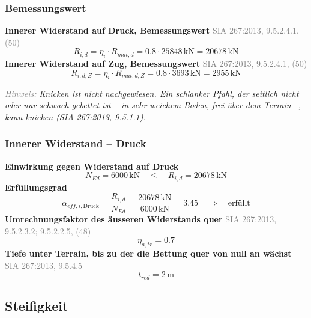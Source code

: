 \documentclass[11pt,a4paper]{article}
\newcommand{\normref}[1]{{\small\textcolor{gray}{#1}}}
\newcommand{\hinweis}[2]{\par\noindent\textcolor{gray}{\textit{#1:}} \textit{#2}\par}
\begin{document}
\subsubsection{Bemessungswert}
\noindent\textbf{Innerer Widerstand auf Druck, Bemessungswert} \hfill \normref{SIA 267:2013, 9.5.2.4.1, (50)}
\begin{equation*}
R_{i,d} = \eta_i \cdot R_{mat,d} = 0.8 \cdot 25848\,\mathrm{kN} = 20678\,\mathrm{kN}
\end{equation*}
\noindent\textbf{Innerer Widerstand auf Zug, Bemessungswert} \hfill \normref{SIA 267:2013, 9.5.2.4.1, (50)}
\begin{equation*}
R_{i,d,Z} = \eta_i \cdot R_{mat,d,Z} = 0.8 \cdot 3693\,\mathrm{kN} = 2955\,\mathrm{kN}
\end{equation*}
\hinweis{Hinweis}{Knicken ist nicht nachgewiesen. Ein schlanker Pfahl, der seitlich nicht oder nur schwach gebettet ist -- in sehr weichem Boden, frei über dem Terrain --, kann knicken (SIA 267:2013, 9.5.1.1).}
\subsubsection{Innerer Widerstand – Druck}
\noindent\textbf{Einwirkung gegen Widerstand auf Druck}
\begin{equation*}
N_{Ed} = 6000\,\mathrm{kN} \quad \le \quad R_{i,d} = 20678\,\mathrm{kN}
\end{equation*}
\noindent\textbf{Erfüllungsgrad}
\begin{equation*}
\alpha_{eff,i,\text{Druck}} = \frac{R_{i,d}}{N_{Ed}} = \frac{20678\,\mathrm{kN}}{6000\,\mathrm{kN}} = 3.45 \quad \Rightarrow \quad \text{erfüllt}
\end{equation*}
\noindent\textbf{Umrechnungsfaktor des äusseren Widerstands quer} \hfill \normref{SIA 267:2013, 9.5.2.3.2; 9.5.2.2.5, (48)}
\begin{equation*}
\eta_{a,tr} = 0.7
\end{equation*}
\noindent\textbf{Tiefe unter Terrain, bis zu der die Bettung quer von null an wächst} \hfill \normref{SIA 267:2013, 9.5.4.5}
\begin{equation*}
t_{red} = 2\,\mathrm{m}
\end{equation*}
\subsection{Steifigkeit}
\end{document}
